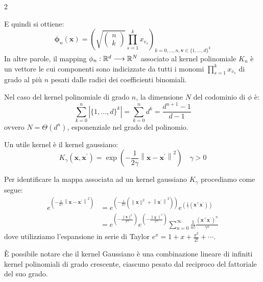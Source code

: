 \documentclass[\main/main.tex]{subfiles}
\begin{document}
\begin{multicols}{2}
\begin{definition}
    E quindi si ottiene:
    \[\boldsymbol{\phi}_{n}(\boldsymbol{x})=\left(\sqrt{\left( \begin{array}{c}{n} \\ {k}\end{array}\right)} \prod_{s=1}^{k} x_{v_{s}}\right)_{k=0, \ldots, n, \boldsymbol{v} \in\{1, \ldots, d\}^{k}}\]
    In altre parole, il mapping \(\phi_n:\mathbb{R}^d\longrightarrow \mathbb{R}^N\) associato al kernel polinomiale \(K_n\) è un vettore le cui componenti sono indicizzate da tutti i monomi \(\prod_{s=1}^{k} x_{v_{s}}\) di grado al più \(n\) pesati dalle radici dei coefficienti binomiali.
    
    Nel caso del kernel polinomiale di grado \(n\), la dimensione \(N\) del codominio di \(\phi\) è:
    \[\sum_{k=0}^{n}\left|\{1, \ldots, d\}^{k}\right|=\sum_{k=0}^{n} d^{k}=\frac{d^{n+1}-1}{d-1}\]
    ovvero \(N=\Theta\left(d^{n}\right)\), esponenziale nel grado del polinomio.
\end{definition}
\begin{definition}
    Un utile kernel è il kernel gaussiano:
    \[K_{\gamma}\left(\boldsymbol{x}, \boldsymbol{x}^{\prime}\right)=\exp \left(-\frac{1}{2 \gamma}\left\|\boldsymbol{x}-\boldsymbol{x}^{\prime}\right\|^{2}\right) \quad \gamma>0\]
\end{definition}
\begin{definition}
    Per identificare la mappa associata ad un kernel gaussiano \(K_{\gamma}\) procediamo come segue:
    \begin{align*} e^{\left(-\frac{1}{2 \gamma}\left\|\boldsymbol{x}-\boldsymbol{x}^{\prime}\right\|^{2}\right)} &=e^{ \left(-\frac{1}{2 \gamma}\left(\|\boldsymbol{x}\|^{2}+\left\|\boldsymbol{x}^{\prime}\right\|^{2}\right)\right)} e^{\left(\frac{1}{\gamma}\left(\boldsymbol{x}^{\top} \boldsymbol{x}^{\prime}\right)\right)} \\ &=e^{ \left(-\frac{\|\boldsymbol{x}\|^{2}}{2 \gamma}\right)} e^{ \left(-\frac{\left\|\boldsymbol{x}^{\prime}\right\|^{2}}{2 \gamma}\right)} \sum_{n=0}^{\infty} \frac{1}{n !} \frac{\left(\boldsymbol{x}^{\top} \boldsymbol{x}^{\prime}\right)^{n}}{\gamma^{n}} \end{align*}
    dove utilizziamo l'espansione in serie di Taylor \(e^{x}=1+x+\frac{x^{2}}{2 !}+\cdots\).
    
    È possibile notare che il kernel Gaussiano è una combinazione lineare di infiniti kernel polinomiali di grado crescente, ciascuno pesato dal reciproco del fattoriale del suo grado.
    

\end{definition}
\end{multicols}
\end{document}
